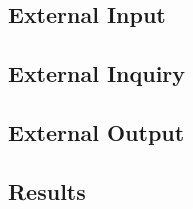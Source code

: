 
\subsection{External Input} %

\subsection{External Inquiry} %


\subsection{External Output} %



\subsection{Results} %


